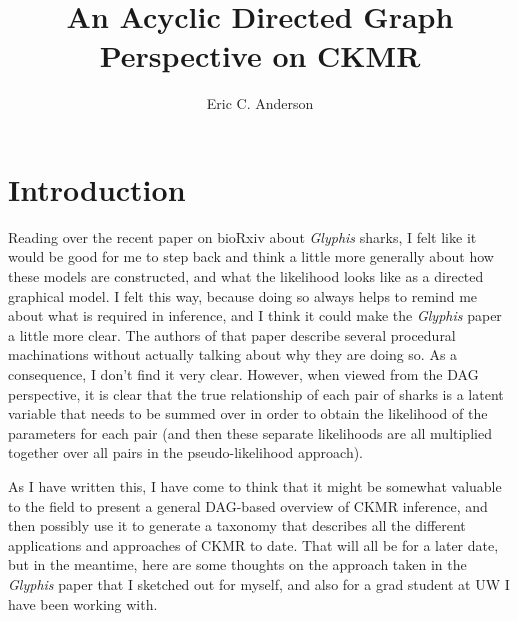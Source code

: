 \documentclass[11pt, oneside]{article}   	%
\title{An Acyclic Directed Graph Perspective on CKMR}
\author{Eric C. Anderson}
\begin{document}
\maketitle

\section{Introduction}

Reading over the recent paper on bioRxiv about {\em Glyphis} sharks, I felt like it would be good for me to
step back and think a little more generally about how these models are constructed, and what the likelihood
looks like as a directed graphical model.  I felt this way, because doing so always helps to remind me about
what is required in inference, and I think it could make the {\em Glyphis} paper a little more clear.  The authors
of that paper describe several procedural machinations without actually talking about why they are doing so.
As a consequence, I don't find it very clear.  However, when viewed from the DAG perspective, it is clear that
the true relationship of each pair of sharks is a latent variable that needs to be summed over in order to obtain the
likelihood of the parameters for each pair (and then these separate likelihoods are all multiplied together
over all pairs in the pseudo-likelihood approach).

As I have written this, I have come to think that it might be somewhat valuable to the field to present
a general DAG-based overview of CKMR inference, and then possibly use it to generate a taxonomy that
describes all the different applications and approaches of CKMR to date.  That will all be for a later date,
but in the meantime, here are some thoughts on the approach taken in the {\em Glyphis} paper that I sketched out
for myself, and also for a grad student at UW I have been working with.
\end{document}
